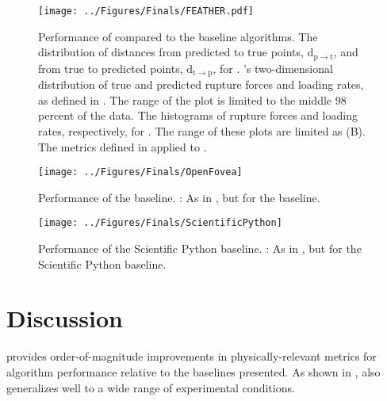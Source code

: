 \begin{figure}[htpb]
\caption[\name{} performance]{\noindent{}Performance of \name{} compared to the baseline algorithms.  The distribution of distances from predicted to true points, d$_{\mathrm{p}\rightarrow\mathrm{t}}$, and from true to predicted points, d$_{\mathrm{t}\rightarrow\mathrm{p}}$, for \name{}.  \name{}'s two-dimensional distribution of true and predicted rupture forces and loading rates, as defined in . The range of the plot is limited to the middle 98 percent of the data.  The histograms of rupture forces and loading rates, respectively, for \name{}. The range of these plots are limited as (B).  The metrics defined in  applied to \name{}. }
\centering
\texttt{[image: ../Figures/Finals/FEATHER.pdf]}%
\end{figure}

\begin{figure}[htpb]
\caption[\OpenFovea{} performance]{\noindent{}Performance of the \OpenFovea{} baseline. : As in , but for the \OpenFovea{} baseline.}
\centering
\texttt{[image: ../Figures/Finals/OpenFovea]}%
\end{figure}



\begin{figure}[htpb]
\caption[Scientific Python performance]{\noindent{}Performance of the Scientific Python baseline. : As in , but for the Scientific Python baseline. }
\centering
\texttt{[image: ../Figures/Finals/ScientificPython]}%
\end{figure}


\chapter{Discussion}


 \name{} provides order-of-magnitude improvements in physically-relevant metrics for algorithm performance relative to the baselines presented. As shown in , \name{} also generalizes well to a wide range of \singlemol{} experimental conditions.  

